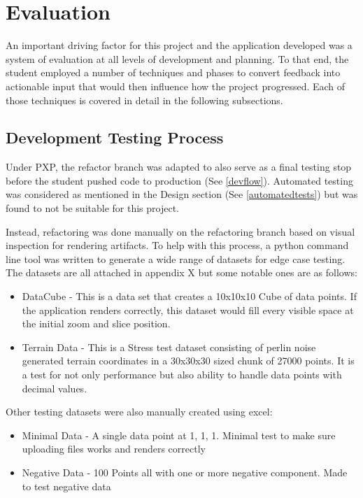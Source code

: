 \section{Evaluation}
An important driving factor for this project and the application developed was a system of evaluation at all levels of development and planning. To that end, the student employed a
number of techniques and phases to convert feedback into actionable input that would then influence how the project progressed. Each of those techniques is covered in detail in the following subsections.

\subsection{Development Testing Process}
Under PXP, the refactor branch was adapted to also serve as a final testing stop before the student pushed code to production (See \ref{devflow}). Automated testing was considered as mentioned in the Design section (See \ref{automatedtests}) but was found to not be suitable for this project.

Instead, refactoring was done manually on the refactoring branch based on visual inspection for rendering artifacts. To help with this process, a python command line tool was written to generate a wide range of datasets for edge case testing. The datasets are all attached in appendix X but some notable ones are as follows:

\begin{itemize}
    \item DataCube - This is a data set that creates a 10x10x10 Cube of data points. If the application renders correctly, this dataset would fill every visible space at the initial zoom and slice position.
    \item Terrain Data - This is a Stress test dataset consisting of perlin noise generated terrain coordinates in a 30x30x30 sized chunk of 27000 points. It is a test for not only performance but also ability to handle data points with decimal values.
\end{itemize}

Other testing datasets were also manually created using excel:
\begin{itemize}
    \item Minimal Data - A single data point at 1, 1, 1. Minimal test to make sure uploading files works and renders correctly
    \item Negative Data - 100 Points all with one or more negative component. Made to test negative data
\end{itemize}

